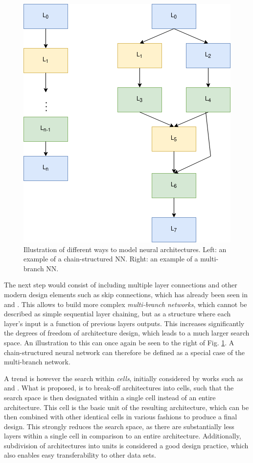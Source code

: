 \documentclass[10pt,        %
               a4paper,     %
               journal,     %
               ]{IEEEtran}
\begin{document}
\begin{figure}[!h]
    \centering
    \includegraphics[scale=0.4]{space}
    \caption{Illustration of different ways to model neural architectures. Left: an example of a chain-structured NN.
             Right: an example of a multi-branch NN.}
    \label{space}
\end{figure}

The next step would consist of including multiple layer connections and other modern design elements such as skip connections, which has already been seen
in \cite{zoph2016neural} and \cite{pmlr-v70-real17a}. This allows to build more complex \textit{multi-branch networks}, which
cannot be described as simple sequential layer chaining, but as a structure where each layer's input is a function of
previous layers outputs. This increases significantly the degrees of freedom of architecture design,
which leads to a much larger search space. An illustration to this can once again be seen to the right of Fig. \ref{space}.
A chain-structured neural network can therefore be defined as a special case of the multi-branch network.

A trend is however the search within \textit{cells}, initially considered by works such as
\cite{zhong2018practical} and \cite{zoph2018learning}. What is proposed, is to break-off architectures into cells, such that
the search space is then designated within a single cell instead of an entire architecture. This cell is the basic unit of the
resulting architecture, which can be then combined with other identical cells in various fashions to produce a final design.
This strongly reduces the search space, as there are substantially less layers within a single cell in comparison to
an entire architecture. Additionally, subdivision of architectures into units is considered a good design practice,
which also enables easy transferability to other data sets.
\end{document}
